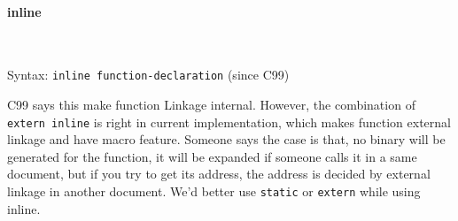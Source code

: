 
\paragraph{inline}\

Syntax: \verb`inline function-declaration` (since C99)

C99\cite{StdC99} says this make function Linkage internal.
However, the combination of \verb'extern inline' is right in current implementation, which makes function external linkage and have macro feature. %
Someone says the case is that, no binary will be generated for the function, it will be expanded if someone calls it in a same document, but if you try to get its address, the address is decided by external linkage in another document. 
We'd better use \verb`static` or \verb`extern` while using inline.

